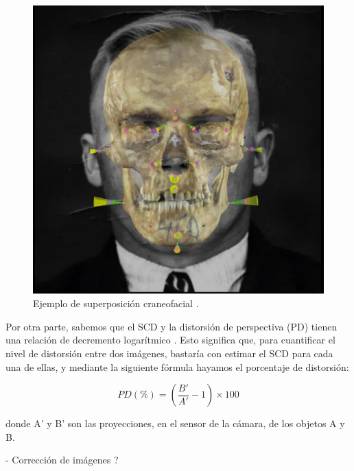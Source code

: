\begin{figure}[h]
	\centering
	\includegraphics[scale=0.25]{imagenes/cap1/skull_superimposition.png}
	\caption{Ejemplo de superposición craneofacial \cite{23}.}
	\label{fig2}
\end{figure}


Por otra parte, sabemos que el SCD y la distorsión de perspectiva (PD) tienen una relación de decremento logarítmico \cite{13}. Esto significa que, para cuantificar el nivel de distorsión entre dos imágenes, bastaría con estimar el SCD para cada una de ellas, y mediante la siguiente fórmula hayamos el porcentaje de distorsión:

$$PD(\%) = (\frac{B'}{A'} - 1) \times 100$$

donde A' y B' son las proyecciones, en el sensor de la cámara, de los objetos A y B.

- Corrección de imágenes ?


